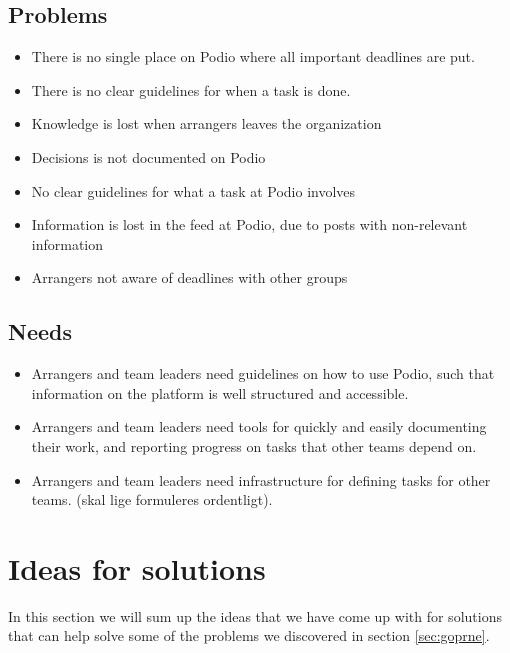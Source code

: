 \subsection{Problems}
\label{subsec:problems}
\begin{itemize}
    \item There is no single place on Podio where all important deadlines are put.
    \item There is no clear guidelines for when a task is done.
	 \item Knowledge is lost when arrangers leaves the organization
	 \item Decisions is not documented on Podio
	 \item No clear guidelines for what a task at Podio involves
	 \item Information is lost in the feed at Podio, due to posts with non-relevant information
	 \item Arrangers not aware of deadlines with other groups
	 
\end{itemize}

\subsection{Needs}
\label{subsec:needs}
\begin{itemize}
    \item Arrangers and team leaders need guidelines on how to use Podio, such that information on the platform is well structured and accessible.
    \item Arrangers and team leaders need tools for quickly and easily documenting their work, and reporting progress on tasks that other teams depend on.
    \item Arrangers and team leaders need infrastructure for defining tasks for other teams. (skal lige formuleres ordentligt).
\end{itemize}

\section{Ideas for solutions}
\label{sec:ideas}
In this section we will sum up the ideas that we have come up with for solutions
that can help solve some of the problems we discovered in section \ref{sec:goprne}.

